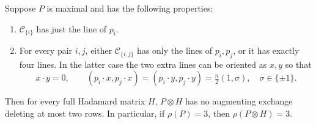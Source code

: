 \begin{theorem}
Suppose $P$ is maximal and has the following properties:
\begin{enumerate}
\item $\mathcal C_{\{i\}}$ has just the line of $p_i$.
\item For every pair $i,j$, either $\mathcal C_{\{i,j\}}$ has only the
lines of $p_i,p_j$, or it has exactly four lines. In the latter case
the two extra lines can be oriented as $x,y$ so that
\[
 x\cdot y=0,\qquad
 (p_i\cdot x,p_j\cdot x)=(p_i\cdot y,p_j\cdot y)
 =\tfrac n2(1,\sigma),\quad\sigma\in\{\pm1\}.
\]
\end{enumerate}
Then for every full Hadamard matrix $H$, $P\otimes H$ has no augmenting
exchange deleting at most two rows. In particular, if $\rho(P)=3$, then
$\rho(P\otimes H)=3$.
\end{theorem}
